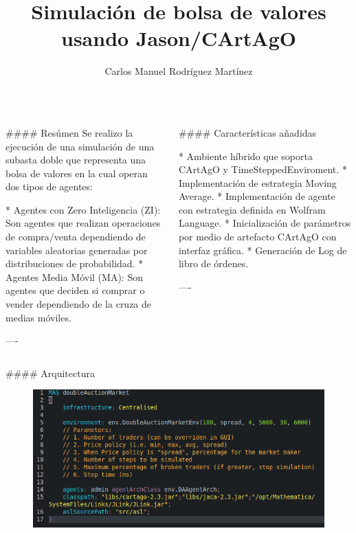 \documentclass{beamer}
\author[fis.carlosmanuel@gmail.com]{Carlos Manuel Rodríguez Martínez}
\title{Simulación de bolsa de valores usando Jason/CArtAgO}
\institute{Universidad Veracruzana}
\begin{document}
\begin{frame}[fragile]\centering

\begin{columns}
\begin{column}{0.57\textwidth}

\begin{markdown}

#### Resúmen
Se realizo la ejecución de una simulación de una subasta doble que representa una bolsa de valores en la cual operan dos tipos de agentes:

* Agentes con Zero Inteligencia (ZI): Son agentes que realizan operaciones de compra/venta dependiendo de variables aleatorias generadas por distribuciones de probabilidad.
* Agentes Media Móvil (MA): Son agentes que deciden si comprar o vender dependiendo de la cruza de medias móviles.

----
\end{markdown}
\end{column}

\begin{column}{.4\textwidth}
\begin{markdown}

#### Características añadidas

* Ambiente híbrido que soporta CArtAgO y TimeSteppedEnviroment.
* Implementación de estrategia Moving Average.
* Implementación de agente con estrategia definida en Wolfram Language.
* Inicialización de parámetros por medio de artefacto CArtAgO con interfaz gráfica.
* Generación de Log de libro de órdenes.


----
\end{markdown}
\end{column}

\end{columns}

\bigskip
{\hrulefill}
\bigskip

\begin{columns}[T]

\begin{column}{.46\textwidth}

\begin{markdown}

#### Arquitectura

\begin{figure}[h!]
\centering
\includegraphics[scale=0.3]{img/code.png}
\end{figure}


\end{markdown}
\end{column}
\end{columns}
\end{frame}
\end{document}

